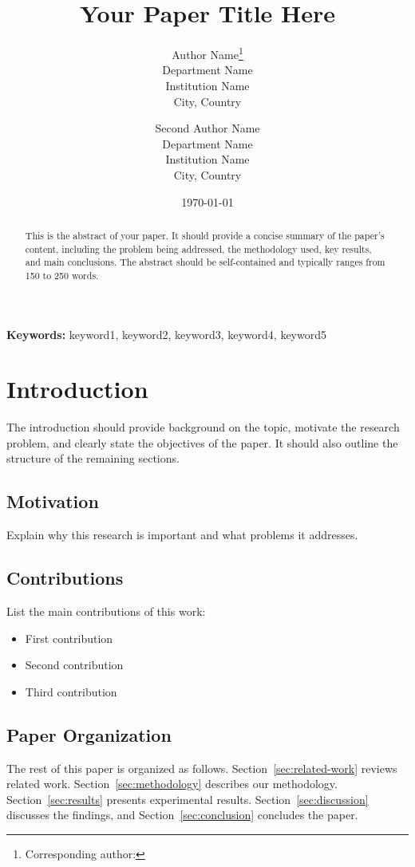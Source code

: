 \documentclass[11pt,a4paper]{article}
\title{Your Paper Title Here}
\author{
    Author Name\thanks{Corresponding author: \email{author@institution.edu}} \\
    \small Department Name \\
    \small Institution Name \\
    \small City, Country
    \and
    Second Author Name \\
    \small Department Name \\
    \small Institution Name \\
    \small City, Country
}
\date{\today}
\theoremstyle{definition}
\theoremstyle{remark}
\begin{document}
\maketitle

\begin{abstract}
This is the abstract of your paper. It should provide a concise summary of the paper's content, including the problem being addressed, the methodology used, key results, and main conclusions. The abstract should be self-contained and typically ranges from 150 to 250 words.
\end{abstract}

\noindent\textbf{Keywords:} keyword1, keyword2, keyword3, keyword4, keyword5

\section{Introduction}
\label{sec:introduction}

The introduction should provide background on the topic, motivate the research problem, and clearly state the objectives of the paper. It should also outline the structure of the remaining sections.

\subsection{Motivation}

Explain why this research is important and what problems it addresses.

\subsection{Contributions}

List the main contributions of this work:
\begin{itemize}
    \item First contribution
    \item Second contribution
    \item Third contribution
\end{itemize}

\subsection{Paper Organization}

The rest of this paper is organized as follows. Section~\ref{sec:related-work} reviews related work. Section~\ref{sec:methodology} describes our methodology. Section~\ref{sec:results} presents experimental results. Section~\ref{sec:discussion} discusses the findings, and Section~\ref{sec:conclusion} concludes the paper.
\end{document}
